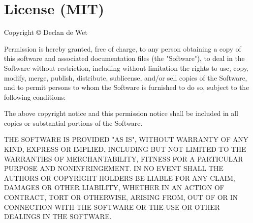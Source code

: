 \chapter{License (MIT)}
\hypertarget{md_pkiclassroomrescheduler_2src_2main_2frontend_2node__modules_2common-tags_2license}{}\label{md_pkiclassroomrescheduler_2src_2main_2frontend_2node__modules_2common-tags_2license}
Copyright © Declan de Wet

Permission is hereby granted, free of charge, to any person obtaining a copy of this software and associated documentation files (the "{}\+Software"{}), to deal in the Software without restriction, including without limitation the rights to use, copy, modify, merge, publish, distribute, sublicense, and/or sell copies of the Software, and to permit persons to whom the Software is furnished to do so, subject to the following conditions\+:

The above copyright notice and this permission notice shall be included in all copies or substantial portions of the Software.

THE SOFTWARE IS PROVIDED "{}\+AS IS"{}, WITHOUT WARRANTY OF ANY KIND, EXPRESS OR IMPLIED, INCLUDING BUT NOT LIMITED TO THE WARRANTIES OF MERCHANTABILITY, FITNESS FOR A PARTICULAR PURPOSE AND NONINFRINGEMENT. IN NO EVENT SHALL THE AUTHORS OR COPYRIGHT HOLDERS BE LIABLE FOR ANY CLAIM, DAMAGES OR OTHER LIABILITY, WHETHER IN AN ACTION OF CONTRACT, TORT OR OTHERWISE, ARISING FROM, OUT OF OR IN CONNECTION WITH THE SOFTWARE OR THE USE OR OTHER DEALINGS IN THE SOFTWARE. 